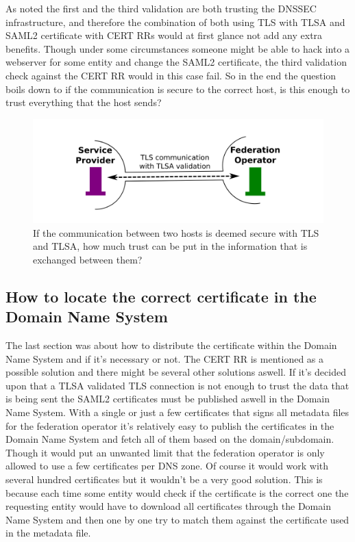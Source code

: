 As noted the first and the third validation are both trusting the DNSSEC infrastructure, and therefore the combination of both using TLS with TLSA and SAML2 certificate with CERT RRs would at first glance not add any extra benefits.
Though under some circumstances someone might be able to hack into a webserver for some entity and change the SAML2 certificate, the third validation check against the CERT RR would in this case fail.
So in the end the question boils down to if the communication is secure to the correct host, is this enough to trust everything that the host sends?

\begin{figure}[ht]
\begin{center}
\includegraphics[scale=1]{Figures/onlyUseTLS.png}
\end{center}
\caption{If the communication between two hosts is deemed secure with TLS and TLSA, how much trust can be put in the information that is exchanged between them?
\label{ch4:onlyUseTLS}}
\end{figure}

\subsection{How to locate the correct certificate in the Domain Name System}
\label{subsec:matching-dilemma}
The last section was about how to distribute the certificate within the Domain Name System and if it's necessary or not.
The CERT RR is mentioned as a possible solution and there might be several other solutions aswell.
If it's decided upon that a TLSA validated TLS connection is not enough to trust the data that is being sent the SAML2 certificates must be published aswell in the Domain Name System.
With a single or just a few certificates that signs all metadata files for the federation operator it's relatively easy to publish the certificates in the Domain Name System and fetch all of them based on the domain/subdomain.
Though it would put an unwanted limit that the federation operator is only allowed to use a few certificates per DNS zone.
Of course it would work with several hundred certificates but it wouldn't be a very good solution.
This is because each time some entity would check if the certificate is the correct one the requesting entity would have to download all certificates through the Domain Name System and then one by one try to match them against the certificate used in the metadata file.

